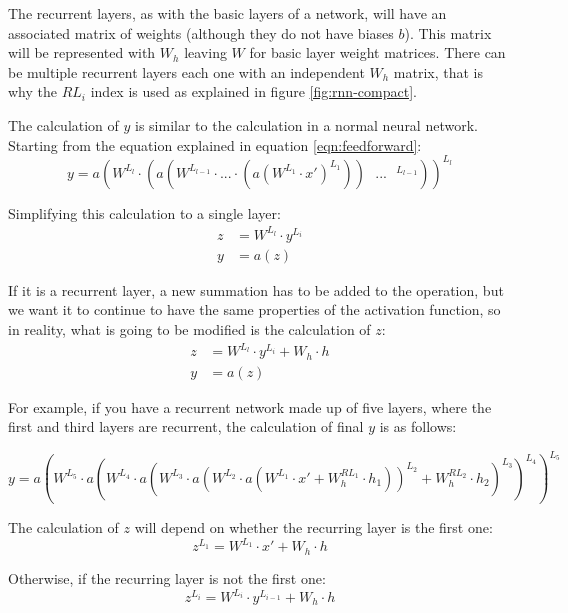 The recurrent layers, as with the basic layers of a network, will have an associated matrix of weights (although they do not have biases $b$). This matrix will be represented with $W_h$ leaving $W$ for basic layer weight matrices. There can be multiple recurrent layers each one with an independent $W_h$ matrix, that is why the $RL_i$ index is used as explained in figure \ref{fig:rnn-compact}.
\newline


The calculation of $y$ is similar to the calculation in a normal neural network. Starting from the equation explained in equation \ref{eqn:feedforward}:
\begin{equation}
    y = a(W^{L_l} \cdot (a(W^{L_{l-1}} \cdot ... \cdot (a(W^{L_1} \cdot x')^{L_1})) \text{ } ... \text{ } ^{L_{l-1}}))^{L_l}
\end{equation}

Simplifying this calculation to a single layer:
\begin{equation}
    \begin{split}
        z &= W^{L_l} \cdot y^{L_i} \\
        y &= a(z)
    \end{split}
\end{equation}

If it is a recurrent layer, a new summation has to be added to the operation, but we want it to continue to have the same properties of the activation function, so in reality, what is going to be modified is the calculation of $z$:
\begin{equation}
    \begin{split}
        z &= W^{L_l} \cdot y^{L_i} + W_h \cdot h \\
        y &= a(z)
    \end{split}
\end{equation}


For example, if you have a recurrent network made up of five layers, where the first and third layers are recurrent, the calculation of final $y$ is as follows:

\begin{equation}
    y = a(W^{L_5} \cdot a(W^{L_4} \cdot a(W^{L_3} \cdot a(W^{L_2} \cdot a(W^{L_1} \cdot x' + W_h^{RL_1} \cdot h_1 ))^{L_2} + W_h^{RL_2} \cdot h_2)^{L_3})^{L_4})^{L_5}
\end{equation}


The calculation of $z$ will depend on whether the recurring layer is the first one:
\begin{equation}
    z^{L_1} = W^{L_1} \cdot x' + W_{h} \cdot h
\end{equation}

Otherwise, if the recurring layer is not the first one:
\begin{equation}
    z^{L_i} = W^{L_i} \cdot y^{L_{i-1}} + W_{h} \cdot h
\end{equation}

